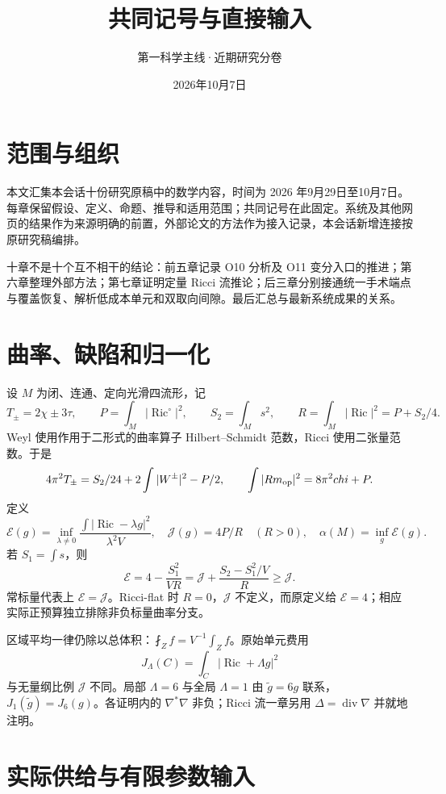\documentclass[UTF8,11pt,fontset=none]{ctexart}
\title{共同记号与直接输入}
\author{第一科学主线·近期研究分卷}
\date{2026年10月7日}
\begin{document}
\maketitle
\section{范围与组织}\label{ch0:ux8303ux56f4ux4e0eux7ec4ux7ec7}

本文汇集本会话十份研究原稿中的数学内容，时间为 2026 年9月29日至10月7日。每章保留假设、定义、命题、推导和适用范围；共同记号在此固定。系统及其他网页的结果作为来源明确的前置，外部论文的方法作为接入记录，本会话新增连接按原研究稿编排。

十章不是十个互不相干的结论：前五章记录 O10 分析及 O11 变分入口的推进；第六章整理外部方法；第七章证明定量 Ricci 流推论；后三章分别接通统一手术端点与覆盖恢复、解析低成本单元和双取向间隙。最后汇总与最新系统成果的关系。

\section{曲率、缺陷和归一化}\label{ch0:ux66f2ux7387ux7f3aux9677ux548cux5f52ux4e00ux5316}

设 \(M\) 为闭、连通、定向光滑四流形，记 \[
T_\pm=2\chi\pm3\tau,\qquad
P=\int_M|\operatorname{Ric}^{\circ}|^2,\qquad
S_2=\int_Ms^2,\qquad R=\int_M|\operatorname{Ric}|^2=P+S_2/4.
\] Weyl 使用作用于二形式的曲率算子 Hilbert--Schmidt 范数，Ricci 使用二张量范数。于是 \[
4\pi^2T_\pm=S_2/24+2\int|W^\pm|^2-P/2,
\qquad\int|\operatorname{Rm}_{\rm op}|^2=8\pi^2\chi+P.
\] 定义 \[
\mathcal E(g)=\inf_{\lambda\ne0}
\frac{\int|\operatorname{Ric}-\lambda g|^2}{\lambda^2V},
\quad\mathcal J(g)=4P/R\quad(R>0),\quad
\alpha(M)=\inf_g\mathcal E(g).
\] 若 \(S_1=\int s\)，则 \[
\mathcal E=4-\frac{S_1^2}{VR}
=\mathcal J+\frac{S_2-S_1^2/V}{R}\ge\mathcal J.
\] 常标量代表上 \(\mathcal E=\mathcal J\)。Ricci-flat 时 \(R=0\)，\(\mathcal J\) 不定义，而原定义给 \(\mathcal E=4\)；相应实际正预算独立排除非负标量曲率分支。

区域平均一律仍除以总体积：\(\fint_Z f=V^{-1}\int_Zf\)。原始单元费用 \[
J_\Lambda(C)=\int_C|\operatorname{Ric}+\Lambda g|^2
\] 与无量纲比例 \(\mathcal J\) 不同。局部 \(\Lambda=6\) 与全局 \(\Lambda=1\) 由 \(\widetilde g=6g\) 联系，\(J_1(\widetilde g)=J_6(g)\)。各证明内的 \(\nabla^*\nabla\) 非负；Ricci 流一章另用 \(\Delta=\operatorname{div}\nabla\) 并就地注明。

\section{实际供给与有限参数输入}\label{ch0:ux5b9eux9645ux4f9bux7ed9ux4e0eux6709ux9650ux53c2ux6570ux8f93ux5165}
\end{document}
